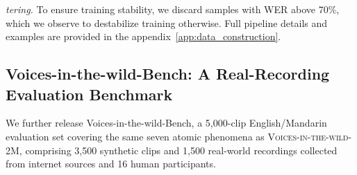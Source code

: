 \documentclass{llmxive}
\begin{document}
\vspace{-1mm}
 \textit{tering.} To ensure training stability, we discard samples with WER above 70\%, 
which we observe to destabilize training otherwise. Full pipeline details and examples are provided in the appendix~\ref{app:data_construction}.

\vspace{-3mm}
\subsection{Voices-in-the-wild-Bench: A Real-Recording Evaluation Benchmark}
\vspace{-2mm}
We further release Voices-in-the-wild-Bench, a 5{,}000-clip English/Mandarin evaluation set covering the same seven atomic phenomena as \textsc{Voices-in-the-wild-2M}, comprising 3{,}500 synthetic clips and 1{,}500 real-world recordings collected from internet sources and 16 human participants.






\end{document}

